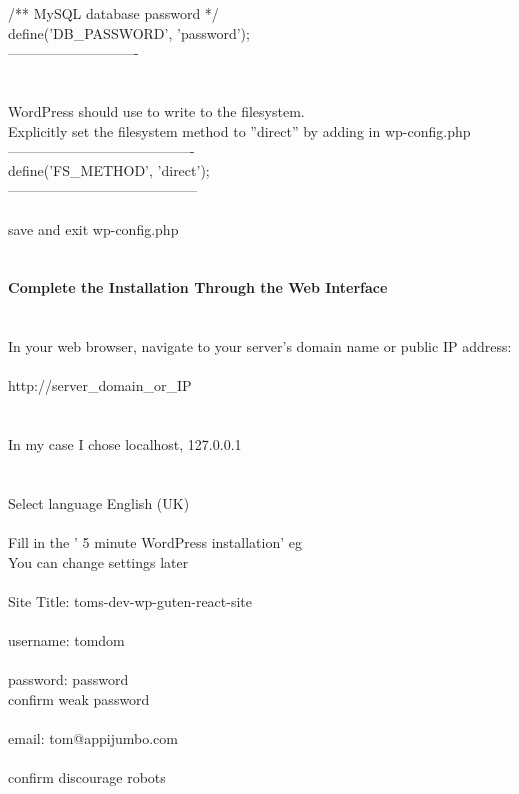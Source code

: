 \documentclass[10pt,a4paper]{article}
\begin{document}
{{{{{{{{{{{{{{{{/** MySQL database password */\\
define('DB\_PASSWORD', 'password');\\
----------------------------\\
\\
\\
WordPress should use to write to the filesystem. \\
Explicitly set the filesystem method to ''direct'' by adding in wp-config.php\\
----------------------------------------\\
define('FS\_METHOD', 'direct');\\
-----------------------------------------\\
\\
save and exit wp-config.php\\
\\
\\
\textbf{Complete the Installation Through the Web Interface}}{\large \\
\\
\\
In your web browser, navigate to your server's domain name or public IP address:\\
\\
http://server\_domain\_or\_IP}{\large \\
\\
\\
In my case I chose localhost,  127.0.0.1\\
\\
\\
Select language  English (UK)\\
\\
Fill in the ' 5 minute WordPress installation' eg \\
You can change settings later\\
\\
Site Title:  toms-dev-wp-guten-react-site\\
\\
username: tomdom\\
\\
password: password\\
confirm weak password\\
\\
email: tom@appijumbo.com}{\large \\
\\
confirm discourage robots\\
\\
}}}}}}}}}}}}}}}}
\end{document}
